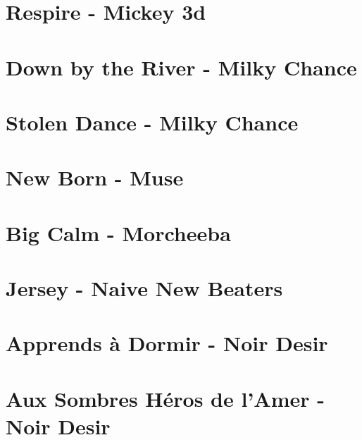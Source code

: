 \documentclass[11pt]{article}
\begin{document}
\section{Respire - Mickey 3d}




\section{Down by the River - Milky Chance}


\section{Stolen Dance - Milky Chance}
\begin{guitar}

\end{guitar}





\section{New Born - Muse}




\section{Big Calm - Morcheeba}


\section{Jersey - Naive New Beaters}
\begin{guitar}

\end{guitar}



\section{Apprends à Dormir - Noir Desir}
\begin{guitar}

\end{guitar}

\section{Aux Sombres Héros de l'Amer - Noir Desir}
\begin{guitar}

\end{guitar}
\end{document}
